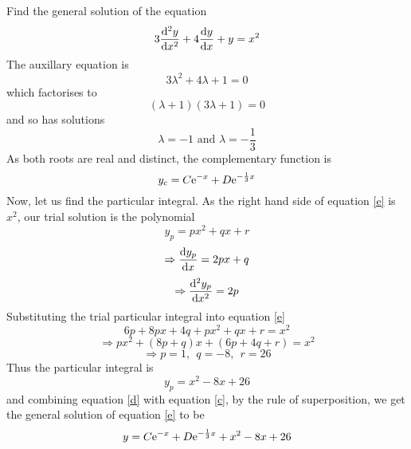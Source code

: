 \documentclass[a4paper,12pt]{article}
\begin{document}
\begin{question}[3]
Find the general solution of the equation
\begin{equation}
\label{e}
3\frac{\mathop{}\!\mathrm{d}{}^2y}{\mathop{}\!\mathrm{d}{}x^2}+4\frac{\mathop{}\!\mathrm{d}{}y}{\mathop{}\!\mathrm{d}{}x}+y=x^2
\end{equation}
The auxillary equation is
\begin{equation}
3\lambda^2+4\lambda+1=0
\end{equation}
which factorises to
\begin{equation}
(\lambda+1)(3\lambda+1)=0
\end{equation}
and so has solutions
\begin{equation}
\lambda=-1 \mbox{\ and\ }\lambda=-\frac{1}{3}
\end{equation}
As both roots are real and distinct, the complementary function is
\begin{equation}
\label{d}
y_c=C\mathrm{e}^{-x}+D\mathrm{e}^{-\frac{1}{3}x}
\end{equation}
Now, let us find the particular integral.  As the right hand side of equation \ref{e} is $x^2$, our trial solution is the polynomial
\begin{equation}
y_p=px^2+qx+r
\end{equation}
\begin{equation}
\Rightarrow \frac{\mathop{}\!\mathrm{d}{}y_p}{\mathop{}\!\mathrm{d}{}x}=2px+q
\end{equation}
\begin{equation}
\Rightarrow \frac{\mathop{}\!\mathrm{d}{}^2y_p}{\mathop{}\!\mathrm{d}{}x^2}=2p
\end{equation}
Substituting the trial particular integral into equation \ref{e}
\begin{equation}
6p+8px+4q+px^2+qx+r=x^2
\end{equation}
\begin{equation}
\Rightarrow px^2+(8p+q)x+(6p+4q+r)=x^2
\end{equation}
\begin{equation}
\Rightarrow p=1,\ \ q=-8,\ \ r=26
\end{equation}
Thus the particular integral is
\begin{equation}
\label{c}
y_p=x^2-8x+26
\end{equation}
and combining equation \ref{d} with equation \ref{c}, by the rule of superposition, we get the general solution of equation \ref{e} to be
\begin{equation}
y=C\mathrm{e}^{-x}+D\mathrm{e}^{-\frac{1}{3}x}+x^2-8x+26
\end{equation}

\end{question}

\end{document}
